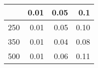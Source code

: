 % 
\begin{tabular}{rrrr}
  \hline
 & 0.01 & 0.05 & 0.1 \\ 
  \hline
250 & 0.01 & 0.05 & 0.10 \\ 
  350 & 0.01 & 0.04 & 0.08 \\ 
  500 & 0.01 & 0.06 & 0.11 \\ 
   \hline
\end{tabular}
